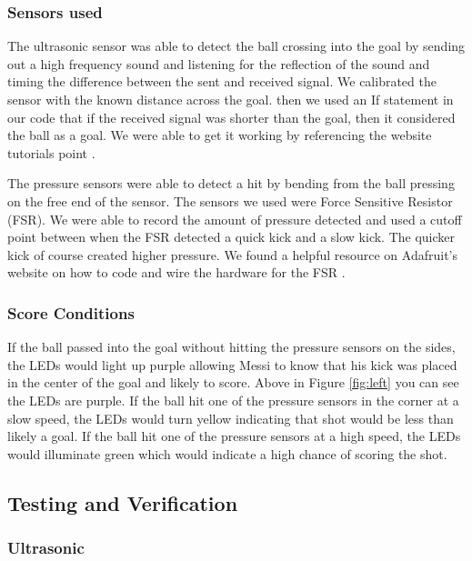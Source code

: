 \documentclass[12pt]{article}
\begin{document}
\subsubsection{Sensors used}

The ultrasonic sensor was able to detect the ball crossing into the goal by sending out a high frequency sound and listening for the reflection of the sound and timing the difference between the sent and received signal. We calibrated the sensor with the known distance across the goal. then we used an If statement in our code that if the received signal was shorter than the goal, then it considered the ball as a goal. We were able to get it working by referencing the website tutorials point \cite{tutorialspoint}. %

The pressure sensors were able to detect a hit by bending from the ball pressing on the free end of the sensor. The sensors we used were Force Sensitive Resistor (FSR). We were able to record the amount of pressure detected and used a cutoff point between when the FSR detected a quick kick and a slow kick. The quicker kick of course created higher pressure. We found a helpful resource on Adafruit's website on how to code and wire the hardware for the FSR \cite{Adafruit}. %


\subsubsection{Score Conditions}
If the ball passed into the goal without hitting the pressure sensors on the sides, the LEDs would light up purple allowing Messi to know that his kick was placed in the center of the goal and likely to score. Above in Figure \ref{fig:left} you can see the LEDs are purple. If the ball hit one of the pressure sensors in the corner at a slow speed, the LEDs would turn yellow indicating that shot would be less than likely a goal. If the ball hit one of the pressure sensors at a high speed, the LEDs would illuminate green which would indicate a high chance of scoring the shot. 



\subsection{Testing and Verification}

\subsubsection{Ultrasonic}
\end{document}
